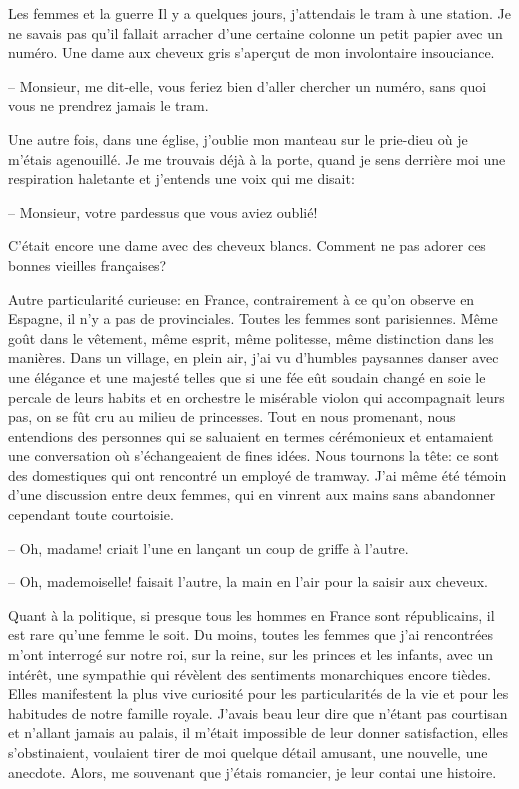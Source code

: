 \begin{chapter}{Les femmes et la guerre}
Il y a quelques jours, j'attendais le tram à une station. Je ne savais
pas qu'il fallait arracher d'une certaine colonne un petit papier avec
un numéro. Une dame aux cheveux gris s'aperçut de mon involontaire
insouciance.

-- Monsieur, me dit-elle, vous feriez bien d'aller chercher un numéro,
sans quoi vous ne prendrez jamais le tram.

Une autre fois, dans une église, j'oublie mon manteau sur le prie-dieu
où je m'étais agenouillé. Je me trouvais déjà à la porte, quand je sens
derrière moi une respiration haletante et j'entends une voix qui me
disait:

-- Monsieur, votre pardessus que vous aviez oublié!

C'était encore une dame avec des cheveux blancs. Comment ne pas adorer
ces bonnes vieilles françaises?

Autre particularité curieuse: en France, contrairement à ce qu'on
observe en Espagne, il n'y a pas de provinciales. Toutes les femmes sont
parisiennes. Même goût dans le vêtement, même esprit, même politesse,
même distinction dans les manières. Dans un village, en plein air, j'ai
vu d'humbles paysannes danser avec une élégance et une majesté telles
que si une fée eût soudain changé en soie le percale de leurs habits et
en orchestre le misérable violon qui accompagnait leurs pas, on se fût
cru au milieu de princesses. Tout en nous promenant, nous entendions des
personnes qui se saluaient en termes cérémonieux et entamaient une
conversation où s'échangeaient de fines idées. Nous tournons la tête: ce
sont des domestiques qui ont rencontré un employé de tramway. J'ai même
été témoin d'une discussion entre deux femmes, qui en vinrent aux mains
sans abandonner cependant toute courtoisie.

-- Oh, madame! criait l'une en lançant un coup de griffe à l'autre.

-- Oh, mademoiselle! faisait l'autre, la main en l'air pour la saisir aux
cheveux.

Quant à la politique, si presque tous les hommes en France sont
républicains, il est rare qu'une femme le soit. Du moins, toutes les
femmes que j'ai rencontrées m'ont interrogé sur notre roi, sur la reine,
sur les princes et les infants, avec un intérêt, une sympathie qui
révèlent des sentiments monarchiques encore tièdes. Elles manifestent la
plus vive curiosité pour les particularités de la vie et pour les
habitudes de notre famille royale. J'avais beau leur dire que n'étant
pas courtisan et n'allant jamais au palais, il m'était impossible de
leur donner satisfaction, elles s'obstinaient, voulaient tirer de moi
quelque détail amusant, une nouvelle, une anecdote. Alors, me souvenant
que j'étais romancier, je leur contai une histoire.


\end{chapter}
